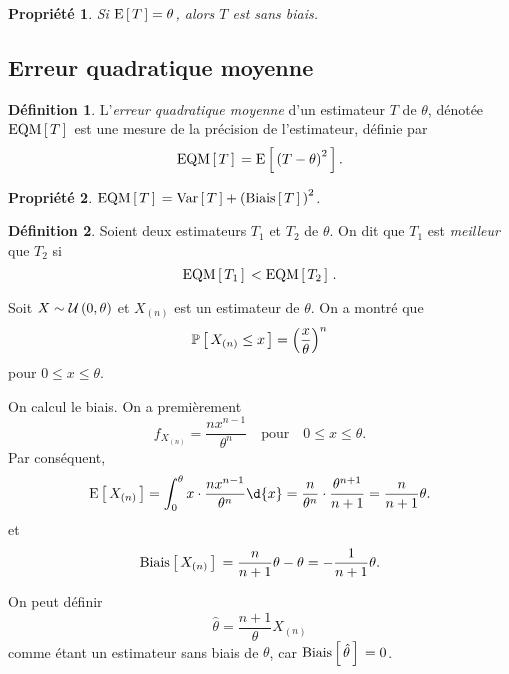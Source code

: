 \documentclass[11pt]{article}
\makeatletter
\renewcommand\P[1]{%
	\ensuremath{%
		\mathbb{P}\left[\,#1\,\right]%
	}%
}%
\newcommand\Uni[2]{%
	\ensuremath{%
		\mathcal{U}\left(#1,#2\right)%
	}%
}%
\newcommand\Esp[1]{%
	\ensuremath{%
		\mathrm{E}\left[\,#1\,\right]%
	}%
}%
\newcommand\Var[1]{%
	\ensuremath{%
		\mathrm{Var}\left[\,#1\,\right]%
	}%
}%
\newcommand\Biais[1]{%
	\ensuremath{%
		\mathrm{Biais}\left[\,#1\,\right]\,%
	}%
}%
\newcommand\EQM[1]{%
	\ensuremath{%
		\mathrm{EQM}\left[\,#1\,\right]\,%
	}%
}%
\newtheorem{property}{Propriété}
\theoremstyle{remark}
\theoremstyle{definition}
\newtheorem*{@definition}{Définition}
\newenvironment{definition}{%
	\begin{@definition}%
}{%
	\end{@definition}%
	\setcounter{property}{0}%
}
\makeatother
\begin{document}
\begin{property}
	Si $\Esp{T}=\theta$, alors $T$ est sans biais.
\end{property}

\subsection{Erreur quadratique moyenne}
\begin{definition}
	L'\textit{erreur quadratique moyenne} d'un estimateur $T$ de $\theta$,
	dénotée $\EQM{T}$ est une mesure de la précision de l'estimateur, définie
	par
	\begin{equation*}
		\EQM{T}=\Esp{\left(T-\theta\right)^2}.
	\end{equation*}
\end{definition}

\begin{property}
	$\EQM{T}=\Var{T}+\left(\Biais{T}\right)^2$.
\end{property}

\begin{definition}
	Soient deux estimateurs $T_1$ et $T_2$ de $\theta$. On dit que $T_1$ est
	\textit{meilleur} que $T_2$ si
	\begin{equation*}
		\EQM{T_1}<\EQM{T_2}.
	\end{equation*}
\end{definition}

\begin{exemple}
	Soit $X\sim\Uni{0}{\theta}$ et $X_{(n)}$ est un estimateur de $\theta$. On
	a montré que
	\begin{equation*}
		\P{X_{(n)}\leq x}=\left(\frac{x}{\theta}\right)^n
	\end{equation*}
	pour $0\leq x\leq\theta$.

	On calcul le biais. On a premièrement
	\begin{equation*}
		f_{X_{(n)}}=\frac{nx^{n-1}}{\theta^n}
		\quad\text{pour}\quad 0\leq x\leq\theta.
	\end{equation*}
	Par conséquent,
	\begin{equation*}
		\Esp{X_{(n)}}
		=\int_0^\theta x\cdot\frac{nx^{n-1}}{\theta^n}\d{x}
		=\frac{n}{\theta^n}\cdot\frac{\theta^{n+1}}{n+1}
		=\frac{n}{n+1}\theta.
	\end{equation*}
	et
	\begin{equation*}
		\Biais{X_{(n)}}
		=\frac{n}{n+1}\theta-\theta
		=-\frac{1}{n+1}\theta.
	\end{equation*}

	On peut définir
	\begin{equation*}
		\hat{\theta}=\frac{n+1}{\theta}X_{(n)}
	\end{equation*}
	comme étant un estimateur sans biais de $\theta$, car 
	$\Biais{\hat{\theta}}=0$.
\end{exemple}
\end{document}
